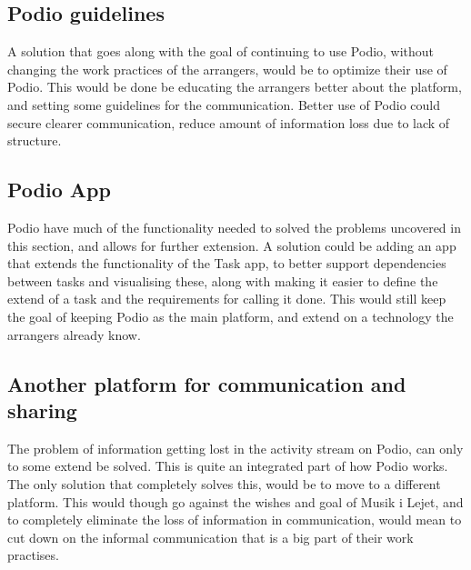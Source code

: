 \subsection{Podio guidelines}
A solution that goes along with the goal of continuing to use Podio, without changing the work practices of the arrangers, would be to optimize their use of Podio. This would be done be educating the arrangers better about the platform, and setting some guidelines for the communication. Better use of Podio could secure clearer communication, reduce amount of information loss due to lack of structure.

\subsection{Podio App}
Podio have much of the functionality needed to solved the problems uncovered in this section, and allows for further extension. A solution could be adding an app that extends the functionality of the Task app, to better support dependencies between tasks and visualising these, along with making it easier to define the extend of a task and the requirements for calling it done. This would still keep the goal of keeping Podio as the main platform, and extend on a technology the arrangers already know.

\subsection{Another platform for communication and sharing}
The problem of information getting lost in the activity stream on Podio, can only to some extend be solved. This is quite an integrated part of how Podio works. The only solution that completely solves this, would be to move to a different platform. This would though go against the wishes and goal of Musik i Lejet, and to completely eliminate the loss of information in communication, would mean to cut down on the informal communication that is a big part of their work practises.
